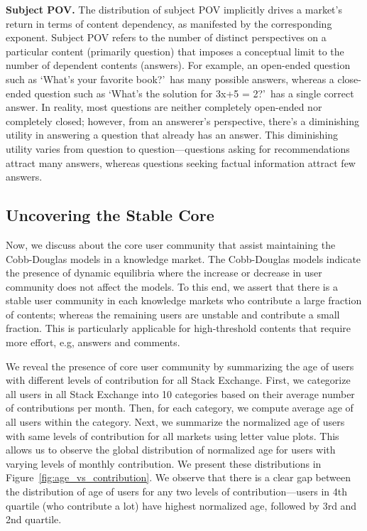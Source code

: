 \textbf{Subject POV.} The distribution of subject POV implicitly drives a market's return in terms of content dependency, as manifested by the corresponding exponent. Subject POV refers to the number of distinct perspectives on a particular content (primarily question) that imposes a conceptual limit to the number of dependent contents (answers). For example, an open-ended question such as \lq What's your favorite book?\rq\ has many possible answers, whereas a close-ended question such as \lq What's the solution for 3x+5 = 2?\rq\ has a single correct answer. In reality, most questions are neither completely open-ended nor completely closed; however, from an answerer's perspective, there's a diminishing utility in answering a question that already has an answer. This diminishing utility varies from question to question---questions asking for recommendations attract many answers, whereas questions seeking factual information attract few answers. 

\subsection{Uncovering the Stable Core} 
Now, we discuss about the core user community that assist maintaining the Cobb-Douglas models in a knowledge market. The Cobb-Douglas models indicate the presence of dynamic equilibria where the increase or decrease in user community does not affect the models. To this end, we assert that there is a stable user community in each knowledge markets who contribute a large fraction of contents; whereas the remaining users are unstable and contribute a small fraction. This is particularly applicable for high-threshold contents that require more effort, e.g, answers and comments. 

We reveal the presence of core user community by summarizing the age of users with different levels of contribution for all Stack Exchange. First, we categorize all users in all Stack Exchange into 10 categories based on their average number of contributions per month. Then, for each category, we compute average age of all users within the category. Next, we summarize the normalized age of users with same levels of contribution for all markets using letter value plots. This allows us to observe the global distribution of normalized age for users with varying levels of monthly contribution. We present these distributions in Figure~\ref{fig:age_vs_contribution}. We observe that there is a clear gap between the distribution of age of users for any two levels of contribution---users in 4th quartile (who contribute a lot) have highest normalized age, followed by 3rd and 2nd quartile. 

